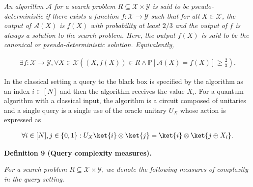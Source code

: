 \documentclass[10pt,a4paper]{article}
\begin{document}
\emph{An algorithm $\mathcal{A}$ for a search problem ${R}\subseteq\mathcal{X}\times\mathcal{Y}$ is said to be pseudo-deterministic if there exists a function $f:\mathcal{X}\rightarrow\mathcal{Y}$ such that for all $X\in\mathcal{X}$, the output of $\mathcal{A}(X)$ is $f(X)$ with probability at least $2/3$ and the output of $f$ is always a solution to the search problem. Here, the output $f(X)$ is said to be the canonical or pseudo-deterministic solution. Equivalently,}\par


\[\begin{gathered}
\exists f:\mathcal{X}\rightarrow\mathcal{Y},\forall X\in\mathcal{X}\left((X,f(X))\in{R}\wedge\mathbb{P}[\mathcal{A}(X)=f(X)]\geq\frac{2}{3}\right).
\end{gathered}\]






In the classical setting a query to the black box is specified by the algorithm as an index $i\in[N]$ and then the algorithm receives the value $X_{i}$. For a quantum algorithm with a classical input, the algorithm is a circuit composed of unitaries and a single query is a single use of the oracle unitary $U_{X}$ whose action is expressed as\par


\[\begin{gathered}
\forall i\in[N],j\in\{0,1\}:U_{X}\ket{i}\otimes\ket{j}=\ket{i}\otimes\ket{j\oplus X_{i}}.
\end{gathered}\]





\par\medskip\noindent\textbf{
\textbf{Definition 9}\textbf{ }(Query complexity measures)\textbf{.}
}\par



\emph{For a search problem ${R}\subseteq\mathcal{X}\times\mathcal{Y}$, we denote the following measures of complexity in the query setting.}\par
\end{document}
